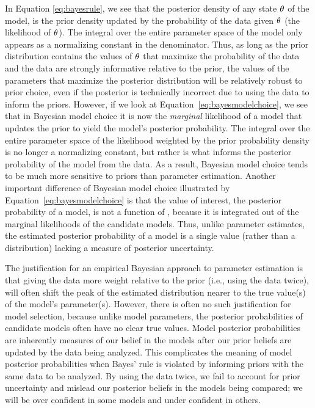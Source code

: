 In Equation \ref{eq:bayesrule}, we see that the posterior density of any state
$\theta_{}$ of the model, is the prior density updated by the probability of
the data given $\theta_{}$ (the likelihood of $\theta_{}$).
The integral over the entire parameter space of the model only appears as a
normalizing constant in the denominator.
Thus, as long as the prior distribution contains the values of $\theta_{}$
that maximize the probability of the data and the data are strongly informative
relative to the prior, the values of the parameters that maximize the posterior
distribution will be relatively robust to prior choice, even if the posterior
is technically incorrect due to using the data to inform the priors.
However, if we look at Equation~\ref{eq:bayesmodelchoice}, we see that in
Bayesian model choice it is now the \emph{marginal} likelihood of a model that
updates the prior to yield the model's posterior probability.
The integral over the entire parameter space of the likelihood weighted by the
prior probability density is no longer a normalizing constant, but rather is
what informs the posterior probability of the model from the data.
As a result, Bayesian model choice tends to be much more sensitive to priors
than parameter estimation.
Another important difference of Bayesian model choice illustrated by
Equation~\ref{eq:bayesmodelchoice} is that the value of interest, the
posterior probability of a model, is not a function of \myTheta{}, because
it is integrated out of the marginal likelihoods of the candidate models.
Thus, unlike parameter estimates, the estimated posterior probability of a
model is a single value (rather than a distribution) lacking a measure of
posterior uncertainty.

The justification for an empirical Bayesian approach to parameter estimation is
that giving the data more weight relative to the prior (i.e., using the data
twice), will often shift the peak of the estimated distribution nearer to the
true value(s) of the model's parameter(s).
However, there is often no such justification for model selection, because
unlike model parameters, the posterior probabilities of candidate models often
have no clear true values.
Model posterior probabilities are inherently measures of our belief in the
models after our prior beliefs are updated by the data being analyzed.
This complicates the meaning of model posterior probabilities when Bayes' rule
is violated by informing priors with the same data to be analyzed.
By using the data twice, we fail to account for prior uncertainty and mislead
our posterior beliefs in the models being compared; we will be over confident
in some models and under confident in others.

